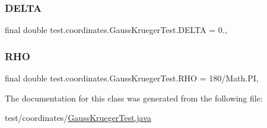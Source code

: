 \subsubsection{\texorpdfstring{D\+E\+L\+TA}{DELTA}}
{\footnotesize\ttfamily final double test.\+coordinates.\+Gauss\+Krueger\+Test.\+D\+E\+L\+TA = 0.\hspace{0.3cm}{\ttfamily [static]}, {\ttfamily [private]}}

\mbox{\label{classtest_1_1coordinates_1_1_gauss_krueger_test_aa03e906f12c6081dcd86c456f3a7b8f0}} 
\subsubsection{\texorpdfstring{R\+HO}{RHO}}
{\footnotesize\ttfamily final double test.\+coordinates.\+Gauss\+Krueger\+Test.\+R\+HO = 180/Math.\+PI\hspace{0.3cm}{\ttfamily [static]}, {\ttfamily [private]}}



The documentation for this class was generated from the following file\+:\begin{DoxyCompactItemize}
\item 
test/coordinates/\hyperlink{_gauss_krueger_test_8java}{Gauss\+Krueger\+Test.\+java}\end{DoxyCompactItemize}
